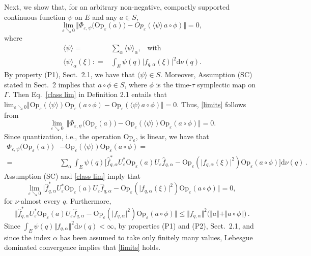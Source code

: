\documentclass[11pt]{article}
\begin{document}
Next, we show that, for an arbitrary non-negative, compactly supported continuous function
$\psi$ on $E$ and any $a\in S$,
\begin{equation}\label{limits}
\underset{\varepsilon \searrow 0}{\text{lim}}\, \Vert \Phi_{\varepsilon, \psi}\big(\text{Op}_{\varepsilon}(a)\big) - 
Op_{\varepsilon}(\langle \psi\rangle\, a\circ \phi)\Vert = 0,
\end{equation}
where
\begin{align}
\langle \psi\rangle = &\sum_{\alpha} \langle \psi \rangle_{\alpha}, \,\,\,\text{ with }\nonumber \\
\langle \psi \rangle_{\alpha}(\xi) : =&\int_{E} \psi(q) \vert f_{q, \alpha}(\xi) \vert^{2} \text{d}\nu(q). \label{meanvalue}
\end{align}
By property (P1), Sect.~2.1, we have that $\langle \psi \rangle \in S$. Moreover, Assumption (SC) stated in Sect.~2 
implies that $a \circ \phi \in S$, where $\phi$ is the time-$\tau$ symplectic map on $\Gamma$. 
Then Eq.~\eqref{class lim} in Definition 2.1 entails that $\text{lim}_{\varepsilon \searrow 0} \Vert \text{Op}_{\varepsilon}
(\langle \psi \rangle) 
\text{Op}_{\varepsilon}(a\circ \phi) - \text{Op}_{\varepsilon}(\langle \psi \rangle\,a\circ \phi) \Vert =0. $ 
Thus, \eqref{limits} follows from
$$
\lim_{\varepsilon \searrow 0} \,\Vert \Phi_{\varepsilon, \psi}\big(\text{Op}_{\varepsilon}(a)\big) - \text{Op}_{\varepsilon}
(\langle \psi \rangle) \text{Op}_{\varepsilon}(a \circ \phi)\Vert =0.
$$
Since quantization, i.e., the operation $\text{Op}_{\varepsilon}$, is linear, we have that
\begin{align}
\Phi_{\varepsilon, \psi}\big(\text{Op}_{\varepsilon}(a)\big)& - \text{Op}_{\varepsilon} (\langle \psi \rangle) 
\text{Op}_{\varepsilon}(a \circ \phi) =\nonumber \\
= &\sum_{\alpha}\int_{E} \psi(q) \big[  \widehat{f}^{*}_{q, \alpha} U_{\varepsilon}^{*} 
\text{Op}_{\varepsilon}(a) U_{\varepsilon} \widehat{f}_{q, \alpha} - \text{Op}_{\varepsilon}( \vert f_{q,\alpha}(\xi)\vert^{2}) \text{Op}_{\varepsilon}(a \circ \phi)\big] \text{d}\nu(q)\,.\nonumber
\end{align}
Assumption (SC) and \eqref{class lim} imply that
$$\underset{\varepsilon \searrow 0}{\text{lim}}\, \Vert \widehat{f}^{*}_{q, \alpha} U_{\varepsilon}^{*} 
\text{Op}_{\varepsilon}(a) U_{\varepsilon} \widehat{f}_{q, \alpha} - \text{Op}_{\varepsilon}( \vert f_{q,\alpha}(\xi)\vert^{2}) \text{Op}_{\varepsilon}(a \circ \phi)\Vert =0,$$
for $\nu$-almost every $q$. Furthermore,
$$\Vert \widehat{f}^{*}_{q, \alpha} U_{\varepsilon}^{*} \text{Op}_{\varepsilon}(a) U_{\varepsilon} \widehat{f}_{q, \alpha} 
- \text{Op}_{\varepsilon}( \vert f_{q,\alpha}\vert^{2}) \text{Op}_{\varepsilon}(a \circ \phi)\Vert \leq 
\Vert f_{q,\alpha} \Vert^{2} \big( \Vert a\Vert + \Vert a\circ \phi \Vert\big)\,.$$
Since $\int_{E} \psi(q) \Vert f_{q,\alpha} \Vert^2 \text{d}\nu(q) < \infty$, by properties (P1) and (P2), Sect.~2.1, 
and since the index $\alpha$ has been assumed to take only finitely many values, Lebesgue dominated convergence 
implies that \eqref{limits} holds.
\end{document}
